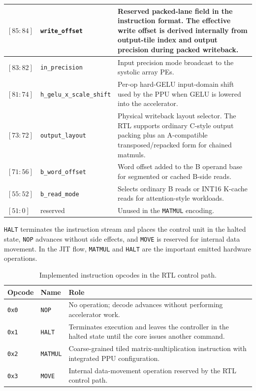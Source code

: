 \documentclass[a4paper, 12pt, titlepage]{article}
\begin{document}
\begin{table}[H]
\begin{tabularx}{\textwidth}{|l|l|Y|}
        \hline
        $[85:84]$ & \texttt{write\_offset} & Reserved packed-lane field in the instruction format. The effective write offset is derived internally from output-tile index and output precision during packed writeback. \\
        \hline
        $[83:82]$ & \texttt{in\_precision} & Input precision mode broadcast to the systolic array PEs. \\
        \hline
        $[81:74]$ & \texttt{h\_gelu\_x\_scale\_shift} & Per-op hard-GELU input-domain shift used by the PPU when GELU is lowered into the accelerator. \\
        \hline
        $[73:72]$ & \texttt{output\_layout} & Physical writeback layout selector. The RTL supports ordinary C-style output packing plus an A-compatible transposed/repacked form for chained matmuls. \\
        \hline
        $[71:56]$ & \texttt{b\_word\_offset} & Word offset added to the B operand base for segmented or cached B-side reads. \\
        \hline
        $[55:52]$ & \texttt{b\_read\_mode} & Selects ordinary B reads or INT16 K-cache reads for attention-style workloads. \\
        \hline
        $[51:0]$ & reserved & Unused in the \texttt{MATMUL} encoding. \\
        \hline
    \end{tabularx}
\end{table}

\texttt{HALT} terminates the instruction stream and places the control unit in the halted state, \texttt{NOP} advances without side effects, and \texttt{MOVE} is reserved for internal data movement. In the JIT flow, \texttt{MATMUL} and \texttt{HALT} are the important emitted hardware operations.

\begin{table}[H]
    \centering
    \small
    \caption{Implemented instruction opcodes in the RTL control path.}
    \label{tab:isa-opcodes}
    \begin{tabularx}{\textwidth}{|l|l|Y|}
        \hline
        \textbf{Opcode} & \textbf{Name} & \textbf{Role} \\
        \hline
        \texttt{0x0} & \texttt{NOP} & No operation; decode advances without performing accelerator work. \\
        \hline
        \texttt{0x1} & \texttt{HALT} & Terminates execution and leaves the controller in the halted state until the core issues another command. \\
        \hline
        \texttt{0x2} & \texttt{MATMUL} & Coarse-grained tiled matrix-multiplication instruction with integrated PPU configuration. \\
        \hline
        \texttt{0x3} & \texttt{MOVE} & Internal data-movement operation reserved by the RTL control path. \\
        \hline
    \end{tabularx}
\end{table}
\end{document}
